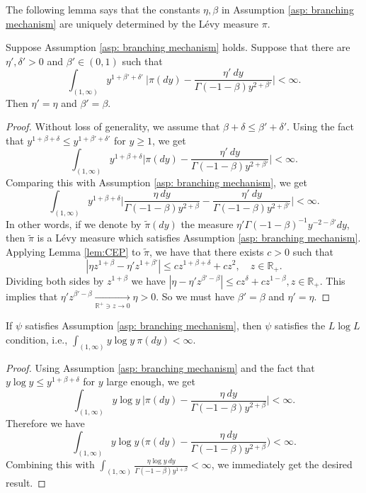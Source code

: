 \documentclass[EJP]{ejpecp} %
\begin{document}
	The following lemma says that the constants $\eta, \beta$ in Assumption \ref{asp: branching mechanism} are uniquely determined by the L\'evy measure $\pi$.

\begin{lemma}
\label{lem: unique of beta and eta}
  	Suppose Assumption  \ref{asp: branching mechanism} holds. Suppose that there are $\eta', \delta'>0$ and $\beta'\in (0,1)$ such that
\[
  	\int_{(1,\infty)} y^{ 1 + \beta'  + \delta' }~ \Big| \pi(dy) - \frac {\eta' ~dy} {\Gamma (- 1 - \beta ) y^{2 + \beta'}} \Big|
    < \infty.
\]
	Then $\eta'= \eta$ and $\beta ' = \beta$.
\end{lemma}

\begin{proof}
	Without loss of generality, we assume that $\beta+\delta \leq \beta'+ \delta'$.
	Using  the fact that $y^{1+\beta+ \delta} \leq y^{1+\beta'+\delta'}$ for $y \geq 1$, we get
\[
    \int_{(1, \infty)} y^{1 + \beta + \delta}   \Big| \pi(dy) - \frac {\eta' ~dy} {\Gamma( - 1 - \beta)y^{2 + \beta'}} \Big|
    < \infty .
\]
	Comparing this with Assumption \ref{asp: branching mechanism}, we get
\[
    \int_{(1,\infty)} y^{ 1 + \beta + \delta} \Big| \frac { \eta ~dy} {\Gamma (- 1 - \beta) y^{2 + \beta}} - \frac {\eta' ~dy} {\Gamma (- 1 - \beta) y^{2 + \beta'}} \Big|
    < \infty.
\]
	In other words, if we denote by $\widetilde \pi(dy)$ the measure $\eta' \Gamma(-1-\beta)^{-1} y^{-2-\beta'} dy$, then $\widetilde \pi$ is a L\'evy measure which satisfies Assumption \ref{asp: branching mechanism}.
	Applying Lemma \ref{lem:CEP} to $\widetilde \pi$, we have that there exists $c>0$ such that
\[
    | \eta z^{ 1 + \beta } - \eta' z^{ 1 + \beta' } |
    \leq c z^{ 1 + \beta + \delta } + c z^2,
    \quad z \in \mathbb R_+.
\]
	Dividing both sides by $z^{1+\beta}$ we have $| \eta - \eta' z^{ \beta' - \beta }| \leq cz^{\delta}+cz^{1-\beta}, z \in \mathbb R_+.$
	This implies that $ \eta' z^{\beta' - \beta} \xrightarrow[\mathbb R^+\ni z\to 0]{} \eta >0. $
	So we must have $\beta'= \beta$ and $\eta'= \eta$.
\end{proof}

\begin{lemma}
\label{lem: LlogL criterion}
	If $\psi$ satisfies Assumption  \ref{asp: branching mechanism}, then $\psi$ satisfies the $L \log L$ condition, i.e., $ \int_{(1,\infty)} y \log y~\pi(dy) < \infty.$
\end{lemma}

\begin{proof}
	Using  Assumption \ref{asp: branching mechanism} and the fact that $y\log y \leq y^{1+\beta+\delta}$ for $y$ large enough, we get
\[
    \int_{(1,\infty)} y \log y ~\Big| \pi(dy) - \frac { \eta ~dy } { \Gamma ( - 1 - \beta ) y^{ 2 + \beta } } \Big|
    < \infty.
\]
	Therefore we have
\[
    \int_{ ( 1, \infty ) } y \log y ~\Big( \pi(dy) - \frac { \eta ~dy } { \Gamma ( - 1 - \beta ) y^{ 2 + \beta } } \Big)
    < \infty.
\]
  	Combining this with $\int_{ ( 1, \infty ) } \frac { \eta \log y ~dy } { \Gamma ( - 1 - \beta ) y^{ 1 + \beta } }< \infty$, we immediately get the desired result.
\end{proof}
\end{document}
